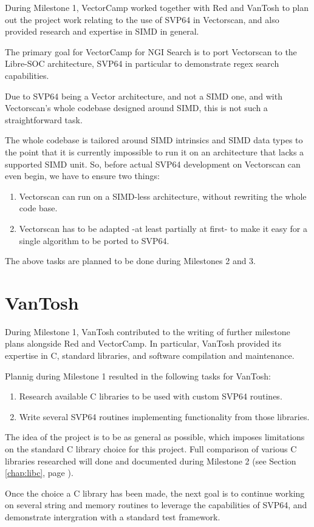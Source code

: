 During Milestone 1, VectorCamp worked together with Red and VanTosh to plan out
the project work relating to the use of \acrshort{SVP64} in Vectorscan, and also provided
research and expertise in \acrshort{SIMD} in general.

The primary goal for VectorCamp for \acrshort{NGI} Search is to port
Vectorscan to the Libre-SOC architecture, \acrshort{SVP64} in particular to demonstrate
regex search capabilities.

Due to \acrshort{SVP64} being a Vector architecture,
and not a \acrshort{SIMD} one, and with Vectorscan’s whole codebase designed around \acrshort{SIMD},
this is not such a straightforward task.

The whole codebase is tailored around \acrshort{SIMD} intrinsics and \acrshort{SIMD} data types to
the point that it is currently impossible to run it on an architecture that
lacks a supported \acrshort{SIMD} unit. So, before actual \acrshort{SVP64} development on Vectorscan
can even begin, we have to ensure two things:

\begin{enumerate}
  \item Vectorscan can run on a \acrshort{SIMD}-less architecture, without rewriting
   the whole code base.
  \item Vectorscan has to be adapted -at least partially at first- to make it easy
   for a single algorithm to be ported to \acrshort{SVP64}.
\end{enumerate}

The above tasks are planned to be done during Milestones 2 and 3.

\section{VanTosh}

During Milestone 1, VanTosh contributed to the writing of further
milestone plans alongside Red and VectorCamp. In particular, VanTosh
provided its expertise in C, standard libraries, and software compilation and
maintenance.

Plannig during Milestone 1 resulted in the following tasks for VanTosh:

\begin{enumerate}
  \item Research available C libraries to be used with custom \acrshort{SVP64} routines.
  \item Write several \acrshort{SVP64} routines implementing functionality from those libraries.
\end{enumerate}

The idea of the project is to be as general as possible, which imposes limitations
on the standard C library choice for this project. Full comparison of various
C libraries researched will done and documented during Milestone 2
(see Section \ref{chap:libc}, page \pageref{chap:libc}).

Once the choice a C library has been made, the next goal is to continue working on
several string and memory routines to leverage the capabilities of \acrshort{SVP64},
and demonstrate intergration with a standard test framework.

